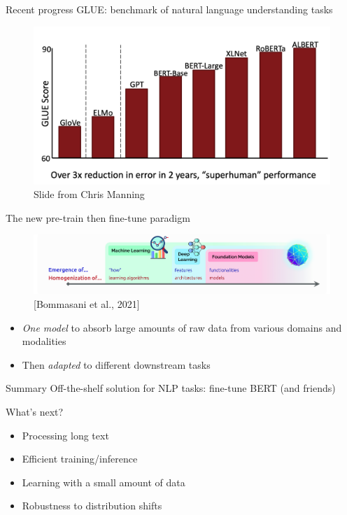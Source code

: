 \documentclass[usenames,dvipsnames,11pt,aspectratio=169]{beamer}
\begin{document}
\begin{frame}
    {Recent progress}
    GLUE: benchmark of natural language understanding tasks
    \begin{figure}
            \includegraphics[width=.8\textwidth]{figures/glue}
            \caption{Slide from Chris Manning}
    \end{figure}
\end{frame}

\begin{frame}
    {The new pre-train then fine-tune paradigm}
    \begin{figure}
            \includegraphics[width=.9\textwidth]{figures/homogenization}
            \caption{[Bommasani et al., 2021]}
    \end{figure}
    \begin{itemize}
\item \emph{One model} to absorb large amounts of raw data from various domains and modalities
\item Then \emph{adapted} to different downstream tasks
    \end{itemize}
\end{frame}

\begin{frame}
    {Summary}
    Off-the-shelf solution for NLP tasks: fine-tune BERT (and friends)

    What's next?\\
    \begin{itemize}
        \item Processing long text
        \item Efficient training/inference
        \item Learning with a small amount of data
        \item Robustness to distribution shifts
    \end{itemize}
\end{frame}
\end{document}
